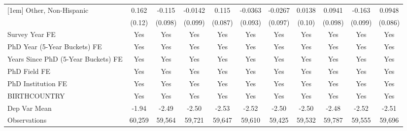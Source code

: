 \begin{table}[htbp]
\begin{tabular}{l*{10}{c}}
[1em]
Other, Non-Hispanic&       0.162         &      -0.115         &     -0.0142         &       0.115         &     -0.0363         &     -0.0267         &      0.0138         &      0.0941         &      -0.163         &      0.0948         \\
  &      (0.12)         &     (0.098)         &     (0.099)         &     (0.087)         &     (0.093)         &     (0.097)         &      (0.10)         &     (0.098)         &     (0.099)         &     (0.086)         \\
[1em]
Survey Year FE&         Yes         &         Yes         &         Yes         &         Yes         &         Yes         &         Yes         &         Yes         &         Yes         &         Yes         &         Yes         \\
[1em]
PhD Year (5-Year Buckets) FE&         Yes         &         Yes         &         Yes         &         Yes         &         Yes         &         Yes         &         Yes         &         Yes         &         Yes         &         Yes         \\
[1em]
Years Since PhD (5-Year Buckets) FE&         Yes         &         Yes         &         Yes         &         Yes         &         Yes         &         Yes         &         Yes         &         Yes         &         Yes         &         Yes         \\
[1em]
PhD Field FE&         Yes         &         Yes         &         Yes         &         Yes         &         Yes         &         Yes         &         Yes         &         Yes         &         Yes         &         Yes         \\
[1em]
PhD Institution FE&         Yes         &         Yes         &         Yes         &         Yes         &         Yes         &         Yes         &         Yes         &         Yes         &         Yes         &         Yes         \\
[1em]
BIRTHCOUNTRY&         Yes         &         Yes         &         Yes         &         Yes         &         Yes         &         Yes         &         Yes         &         Yes         &         Yes         &         Yes         \\
\hline
Dep Var Mean&       -1.94         &       -2.49         &       -2.50         &       -2.53         &       -2.52         &       -2.50         &       -2.50         &       -2.48         &       -2.52         &       -2.51         \\
Observations&      60,259         &      59,564         &      59,721         &      59,647         &      59,610         &      59,425         &      59,532         &      59,787         &      59,555         &      59,696         \\

\end{tabular}
\end{table}
